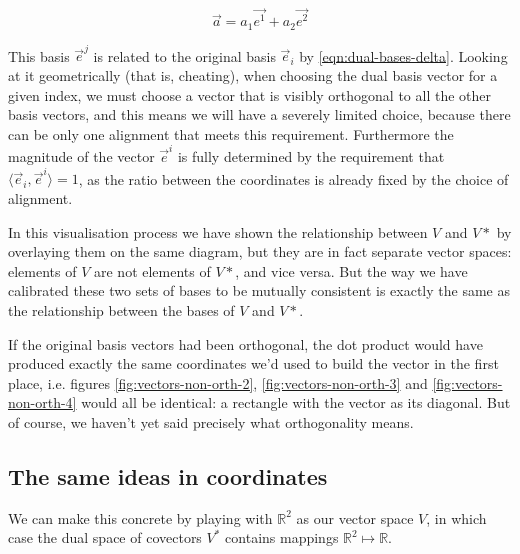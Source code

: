 $$
\vec{a} = a_1 \vec{e^1} + a_2 \vec{e^2}
$$

This basis $\vec{e}^j$ is related to the original basis $\vec{e}_i$ by \eqref{eqn:dual-bases-delta}. Looking at it geometrically (that is, cheating), when choosing the dual basis vector for a given index, we must choose a vector that is visibly orthogonal to all the other basis vectors, and this means we will have a severely limited choice, because there can be only one alignment that meets this requirement. Furthermore the magnitude of the vector $\vec{e}^i$ is fully determined by the requirement that $\langle \vec{e}_i, \vec{e}^i \rangle = 1$, as the ratio between the coordinates is already fixed by the choice of alignment.

In this visualisation process we have shown the relationship between $V$ and $V*$ by overlaying them on the same diagram, but they are in fact separate vector spaces: elements of $V$ are not elements of $V*$, and vice versa. But the way we have calibrated these two sets of bases to be mutually consistent is exactly the same as the relationship between the bases of $V$ and $V*$.

If the original basis vectors had been orthogonal, the dot product would have produced exactly the same coordinates we'd used to build the vector in the first place, i.e. figures \ref{fig:vectors-non-orth-2}, \ref{fig:vectors-non-orth-3} and \ref{fig:vectors-non-orth-4} would all be identical: a rectangle with the vector as its diagonal. But of course, we haven't yet said precisely what orthogonality means.

\subsection{The same ideas in coordinates}

We can make this concrete by playing with $\mathbb{R}^2$ as our vector space $V$, in which case the dual space of covectors $V^*$ contains mappings $\mathbb{R}^2 \mapsto \mathbb{R}$.

